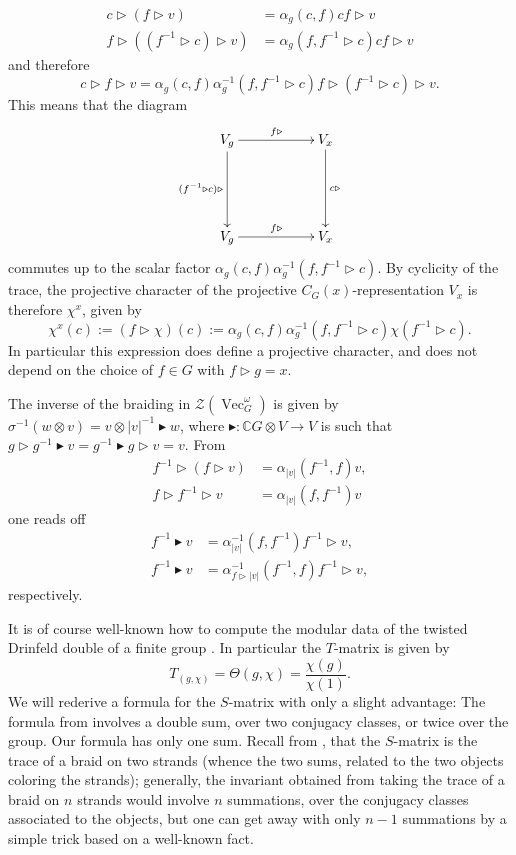 \documentclass[a4paper, 10pt]{book}
\theoremstyle{definition}
\numberwithin{equation}{chapter}
\newcommand\hit{\triangleright}
\newcommand\bhit{\blacktriangleright}
\newcommand\inv{^{-1}}
\newcommand\ot{\otimes}
\newcommand\Vect{\operatorname{Vec}}
\newcommand\CC{\mathbb C}
\newcommand\CTR{\mathcal Z}
\begin{document}
\begin{align}\label{1}
c \hit (f \hit v) &= \alpha_{g}(c, f) cf \hit v\\
f \hit ((f\inv\hit c) \hit v)   &= \alpha_{g}(f, f^{-1}\hit c) cf \hit v
\end{align}
and therefore
\begin{equation*}
  c\hit f\hit v  = \alpha_{g}(c, f) \alpha_{g}\inv(f, f^{-1}\hit c) f \hit (f\inv\hit c)\hit v .
\end{equation*}
This means that the diagram
\begin{equation*}
\xymatrix {V_g \ar[rr]^{f\hit} \ar[dd]_{(f^{-1} \hit c)\hit}   & & V_x \ar[dd]^{c\hit}\\
\\
 V_g \ar[rr]^{f\hit}  & & V_x}
\end{equation*}
commutes up to the scalar factor $\alpha_{g}(c, f) \alpha_{g}\inv(f, f^{-1}\hit c)$. By cyclicity of the trace, the projective character of the projective $C_G(x)$-representation $V_x$ is therefore $\chi^x$, given by
\begin{equation}\label{chi}
  \chi^x(c) :=(f\hit\chi)(c):=\alpha_{g}(c, f) \alpha_{g}\inv(f, f^{-1}\hit c)\chi(f\inv\hit c).
\end{equation}
In particular this expression does define a projective character, and does not depend on the choice of $f\in G$ with $f\hit g=x$.

The inverse of the braiding in $\CTR(\Vect_G^\omega)$ is given by $\sigma\inv(w\ot v)=v\ot |v|\inv\bhit w$, where $\bhit\colon\CC G\otimes V\to V$ is such that $g\hit g\inv\bhit v=g\inv\bhit g\hit v=v$. From
\begin{align*}
  f\inv \hit (f \hit v) &= \alpha_{|v|}(f\inv, f) v,\\
  f\hit f\inv\hit v&=\alpha_{|v|}(f,f\inv)v
\end{align*}
one reads off
\begin{align}\label{blackhit}
f\inv\bhit v&=\alpha_{|v|}\inv(f,f\inv) f\inv\hit v,\\
  f\inv\bhit v&=\alpha_{f\hit|v|}\inv(f\inv,f) f\inv\hit v,
\end{align}
respectively.

It is of course well-known how to compute the modular data of the twisted Drinfeld double of a finite group \cite{MR1770077}. In particular the $T$-matrix is given by
\begin{equation}
  \label{eq:tmatrix}
  T_{(g,\chi)}=\Theta(g,\chi)=\frac{\chi(g)}{\chi(1)}.
\end{equation}
We will rederive a formula for the $S$-matrix with only a slight advantage: The formula from \cite{MR1770077} involves a double sum, over two conjugacy classes, or twice over the group. Our formula has only one sum. Recall from \cite{MR1770077}, that the $S$-matrix is the trace of a braid on two strands (whence the two sums, related to the two objects coloring the strands); generally, the invariant obtained from taking the trace of a braid on $n$ strands would involve $n$ summations, over the conjugacy classes associated to the objects, but one can get away with only $n-1$ summations by a simple trick based on a well-known fact.
\end{document}
